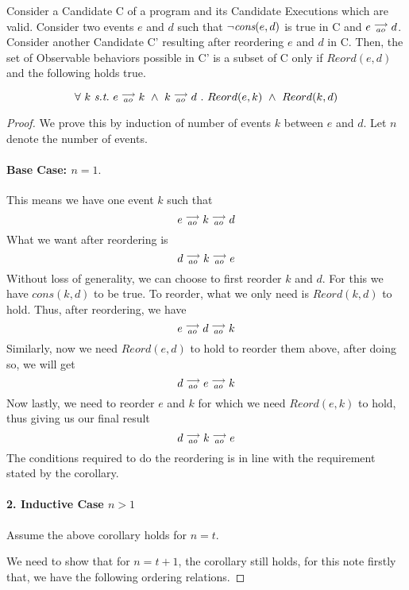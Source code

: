 \begin{corollary}
    Consider a Candidate C of a program and its Candidate Executions which are valid. Consider two events $e$ and $d$ such that $\neg \textit{cons}(e,d)$ is true in C and $e\stackrel{\longrightarrow}{_{ao}}d$. 
    Consider another Candidate C' resulting after reordering $e$ and $d$ in C. 
    Then, the set of Observable behaviors possible in C' is a subset of C only if $Reord(e,d)$ and the following holds true.
    
    \[
        \forall \ k \ \textit{s.t.} \ 
        \reln{e}{ao}{k} \ \wedge \ \reln{k}{ao}{d} \ . \ 
        Reord(e,k) \ \wedge \ Reord(k,d)
    \]
    
\end{corollary}
    
\begin{proof}
    We prove this by induction of number of events $k$ between $e$ and $d$. Let $n$ denote the number of events.

    \paragraph{Base Case: $n = 1.$}
        This means we have one event $k$ such that
            \[
                e\stackrel{\longrightarrow}{_{ao}}k\stackrel{\longrightarrow}{_{ao}}d 
            \]
        What we want after reordering is 
        \[
            d\stackrel{\longrightarrow}{_{ao}}k\stackrel{\longrightarrow}{_{ao}}e 
        \]
        Without loss of generality, we can choose to first reorder $k$ and $d$. For this we have $cons(k,d)$ to be true. To reorder, what we only need is $Reord(k,d)$ to hold. Thus, after reordering, we have
        \[
            e\stackrel{\longrightarrow}{_{ao}}d\stackrel{\longrightarrow}{_{ao}}k 
        \]
        Similarly, now we need $Reord(e,d)$ to hold to reorder them above, after doing so, we will get
        \[
            d\stackrel{\longrightarrow}{_{ao}}e\stackrel{\longrightarrow}{_{ao}}k 
        \]
        Now lastly, we need to reorder $e$ and $k$ for which we need $Reord(e,k)$ to hold, thus giving us our final result
        \[
            d\stackrel{\longrightarrow}{_{ao}}k\stackrel{\longrightarrow}{_{ao}}e 
        \]
        The conditions required to do the reordering is in line with the requirement stated by the corollary. 

    \paragraph{2. Inductive Case $n > 1$}
        Assume the above corollary holds for $n = t$. 
        
        We need to show that for $n = t + 1$, the corollary still holds, for this note firstly that, we have the following ordering relations. 
        

\end{proof}
